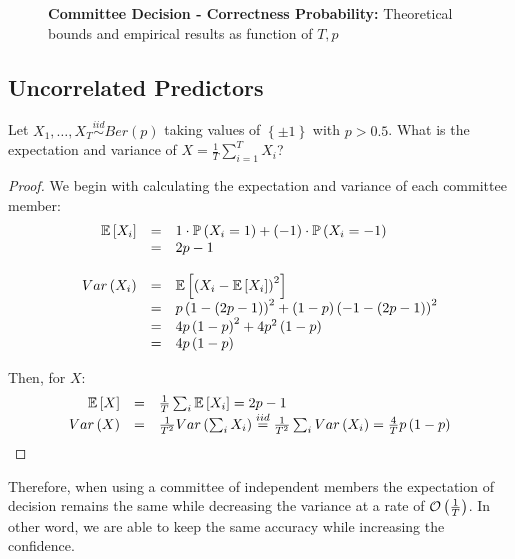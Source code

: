 \begin{figure}[h!]
	\centering
	\caption{\textbf{Committee Decision - Correctness Probability:} Theoretical bounds and empirical results as function of $T,p$}
\end{figure}

\subsection{Uncorrelated Predictors}

\begin{exercise}
Let $X_1,\ldots,X_T\overset{iid}{\sim}Ber\left(p\right)$ taking values of $\left\{\pm1\right\}$ with $p>0.5$. What is the expectation and variance of $X=\frac{1}{T}\sum^T_{i=1}X_i$?
\end{exercise}
\begin{proof}
We begin with calculating the expectation and variance of each committee member:
$$
\begin{array}{rcl}
\mathbb{E}\left[X_{i}\right] & = & 1\cdot\mathbb{P}\left(X_{i}=1\right)+\left(-1\right)\cdot\mathbb{P}\left(X_{i}=-1\right)\\
& = & 2p-1\\
\\
Var\left(X_{i}\right) & = & \mathbb{E}\left[\left(X_{i}-\mathbb{E}\left[X_{i}\right]\right)^{2}\right]\\
& = & p\left(1-\left(2p-1\right)\right)^{2}+\left(1-p\right)\left(-1-\left(2p-1\right)\right)^{2}\\
& = & 4p\left(1-p\right)^{2}+4p^{2}\left(1-p\right)\\
& = & 4p\left(1-p\right)
\end{array}
$$

Then, for $X$:
$$
\begin{array}{rcl}
\mathbb{E}\left[X\right] & = & \frac{1}{T}\sum_{i}\mathbb{E}\left[X_{i}\right]=2p-1\\
Var\left(X\right) & = & \frac{1}{T^{2}}Var\left(\sum_{i}X_{i}\right)\overset{iid}{=}\frac{1}{T^{2}}\sum_{i}Var\left(X_{i}\right)=\frac{4}{T}p\left(1-p\right)
\end{array}
$$
\end{proof}

Therefore, when using a committee of independent members the expectation of decision remains the same while decreasing the variance at a rate of $\mathcal{O}\left(\frac{1}{T}\right)$. In other word, we are able to keep the same accuracy while increasing the confidence.

